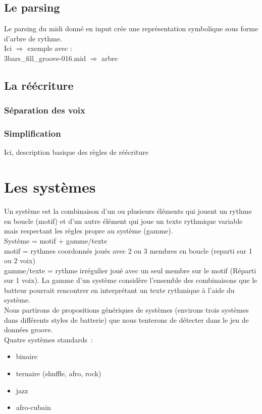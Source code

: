 \subsection*{Le parsing}
Le parsing du midi donné en input crée une représentation symbolique sous forme d’arbre de rythme.\\
Ici $\Rightarrow$ exemple avec :\\
3bars\_fill\_groove-016.mid $\Rightarrow$ arbre\\
\subsection*{La réécriture}
\subsubsection{Séparation des voix}
\subsubsection{Simplification}
Ici, description basique des règles de réécriture 
\section{Les systèmes}
\label{systemes_methodes}
Un système est la combinaison d’un ou plusieurs éléments qui jouent un rythme en boucle (motif) et d’un autre élément qui joue un texte rythmique variable mais respectant les règles propre au système (gamme).\\

Système = motif + gamme/texte\\
motif = rythmes coordonnés joués avec 2 ou 3 membres en boucle (reparti sur 1 ou 2 voix)\\
gamme/texte = rythme irrégulier joué avec un seul membre sur le motif (Réparti sur 1 voix). La gamme d’un système considère l’ensemble des combinaisons que le batteur pourrait rencontrer en interprétant un texte rythmique à l’aide du système.\\

Nous partirons de propositions génériques de systèmes (environs trois systèmes dans différents styles de batterie) que nous tenterons de détecter dans le jeu de données groove.\\

Quatre systèmes standards :
\begin{itemize}
	\item binaire
	\item ternaire (shuffle, afro, rock)
	\item jazz
	\item afro-cubain\\
\end{itemize}

